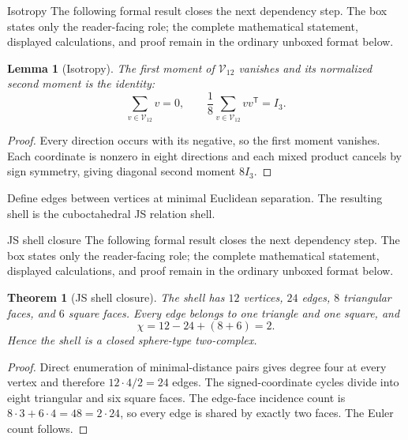 \documentclass[11pt]{article}
\numberwithin{equation}{section}
\newtheorem{lemma}[definition]{Lemma}
\newtheorem{theorem}[definition]{Theorem}
\theoremstyle{remark}
\begin{document}
\begin{proofguide}{Isotropy}
The following formal result closes the next dependency step. The box states only the reader-facing role; the complete mathematical statement, displayed calculations, and proof remain in the ordinary unboxed format below.
\end{proofguide}
\begin{lemma}[Isotropy]
The first moment of $\mathcal V_{12}$ vanishes and its normalized second moment is the identity:
\begin{equation}
\sum_{v\in\mathcal V_{12}}v=0,
\qquad
\frac18\sum_{v\in\mathcal V_{12}}vv^{\mathsf T}=I_3.
\end{equation}
\end{lemma}
\begin{proof}
Every direction occurs with its negative, so the first moment vanishes. Each coordinate is nonzero in eight directions and each mixed product cancels by sign symmetry, giving diagonal second moment $8I_3$.
\end{proof}

Define edges between vertices at minimal Euclidean separation. The resulting shell is the cuboctahedral JS relation shell.

\begin{proofguide}{JS shell closure}
The following formal result closes the next dependency step. The box states only the reader-facing role; the complete mathematical statement, displayed calculations, and proof remain in the ordinary unboxed format below.
\end{proofguide}
\begin{theorem}[JS shell closure]
The shell has $12$ vertices, $24$ edges, $8$ triangular faces, and $6$ square faces. Every edge belongs to one triangle and one square, and
\begin{equation}
\chi=12-24+(8+6)=2.
\end{equation}
Hence the shell is a closed sphere-type two-complex.
\end{theorem}

\begin{proof}
Direct enumeration of minimal-distance pairs gives degree four at every vertex and therefore $12\cdot4/2=24$ edges. The signed-coordinate cycles divide into eight triangular and six square faces. The edge-face incidence count is $8\cdot3+6\cdot4=48=2\cdot24$, so every edge is shared by exactly two faces. The Euler count follows.
\end{proof}
\end{document}
